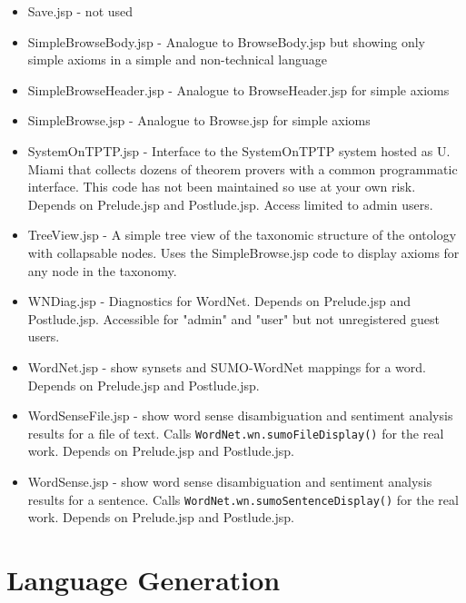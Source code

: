 \documentclass{book}
\begin{document}
\begin{itemize}
\item Save.jsp - not used

\item SimpleBrowseBody.jsp - Analogue to BrowseBody.jsp but showing only simple axioms in a simple
and non-technical language

\item SimpleBrowseHeader.jsp - Analogue to BrowseHeader.jsp for simple axioms

\item SimpleBrowse.jsp - Analogue to Browse.jsp for simple axioms

\item SystemOnTPTP.jsp - Interface to the SystemOnTPTP system hosted as U. Miami that collects
dozens of theorem provers with a common programmatic interface.  This code has not been
maintained so use at your own risk. Depends on Prelude.jsp and Postlude.jsp. Access
limited to admin users.

\item TreeView.jsp - A simple tree view of the taxonomic structure of the ontology with collapsable
nodes.  Uses the SimpleBrowse.jsp code to display axioms for any node in the taxonomy.

\item WNDiag.jsp - Diagnostics for WordNet. Depends on Prelude.jsp and Postlude.jsp. Accessible
for "admin" and "user" but not unregistered guest users.

\item WordNet.jsp - show synsets and SUMO-WordNet mappings for a word. Depends on Prelude.jsp
and Postlude.jsp.

\item WordSenseFile.jsp - show word sense disambiguation and sentiment analysis results for a
file of text.  Calls \texttt{WordNet.wn.sumoFileDisplay()} for the real work. Depends on
Prelude.jsp and Postlude.jsp.

\item WordSense.jsp - show word sense disambiguation and sentiment analysis results for a
sentence.  Calls \texttt{WordNet.wn.sumoSentenceDisplay()} for the real work. Depends on
Prelude.jsp and Postlude.jsp.

\end{itemize}

\section{Language Generation}
\label{chap:KnowEngi:sec:LangGene}
\end{document}
